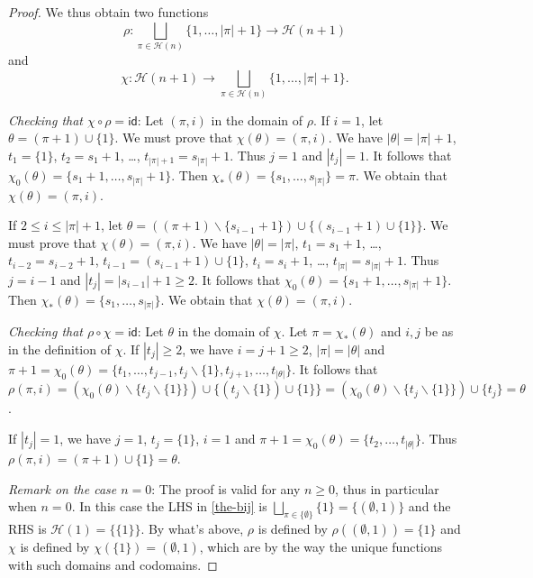 \documentclass[10pt,a4paper]{amsart}
\begin{document}
\begin{proof}
We thus obtain two functions 
\begin{equation*}
\rho\colon \underset{\pi \in \mathcal{H}(n)}{\bigsqcup}\{1,\dots,|\pi|+1\} \longrightarrow \mathcal{H}(n+1)
\end{equation*}
and
\begin{equation*}
\chi\colon \mathcal{H}(n+1) \longrightarrow \underset{\pi \in \mathcal{H}(n)}{\bigsqcup}\{1,\dots,|\pi|+1\}.
\end{equation*}

\emph{Checking that $\chi \circ \rho=\mathsf{id}$}: Let $(\pi,i)$ in the domain of $\rho$. If $i=1$, let $\theta=(\pi+1) \cup \{1\}$. We must prove that 
$\chi(\theta)=(\pi,i)$. We have $|\theta|=|\pi|+1$, $t_1=\{1\}$, $t_2=s_1+1$, \dots, $t_{|\pi|+1}=s_{|\pi|}+1$. Thus $j=1$ and $|t_j|=1$. It follows that 
$\chi_0(\theta)=\{s_1+1,\dots,s_{|\pi|}+1\}$. Then $\chi_*(\theta)=\{s_1,\dots,s_{|\pi|}\}=\pi$. We obtain that $\chi(\theta)=(\pi,i)$.

If $2 \le i \le |\pi|+1$, let $\theta=((\pi+1) \backslash \{s_{i-1}+1\}) \cup \{(s_{i-1}+1) \cup \{1\}\}$. We must prove that $\chi(\theta)=(\pi,i)$. We have 
$|\theta|=|\pi|$, $t_1=s_1+1$, \dots, $t_{i-2}=s_{i-2}+1$, $t_{i-1}=(s_{i-1}+1) \cup \{1\}$, $t_i=s_i+1$, \dots, $t_{|\pi|}=s_{|\pi|}+1$. Thus $j=i-1$ and 
$|t_j|=|s_{i-1}|+1 \ge 2$. It follows that $\chi_0(\theta)=\{s_1+1,\dots,s_{|\pi|}+1\}$. Then $\chi_*(\theta)=\{s_1,\dots,s_{|\pi|}\}$. We obtain that $\chi(\theta)=(\pi,i)$.

\emph{Checking that $\rho \circ \chi=\mathsf{id}$}: Let $\theta$ in the domain of $\chi$. Let $\pi=\chi_*(\theta)$ and $i,j$ be as in the definition of 
$\chi$. If $|t_j| \ge 2$, we have $i=j+1 \ge 2$, $|\pi|=|\theta|$ and $\pi+1=\chi_0(\theta)=\{t_1,\dots,t_{j-1},t_j \backslash \{1\},t_{j+1},\dots,t_{|\theta|}\}$. 
It follows that $\rho(\pi,i)=(\chi_0(\theta) \backslash \{t_j \backslash \{1\}\}) \cup \{(t_j \backslash \{1\}) \cup \{1\}\}=(\chi_0(\theta) 
\backslash \{t_j \backslash \{1\}\}) \cup \{t_j\}=\theta$.

If $|t_j|=1$, we have $j=1$, $t_j=\{1\}$, $i=1$ and $\pi+1=\chi_0(\theta)=\{t_2,\dots,t_{|\theta|}\}$. Thus $\rho(\pi,i)=(\pi+1) \cup \{1\}=\theta$.

\emph{Remark on the case $n=0$}: The proof is valid for any $n \ge 0$, thus in particular when $n=0$. In this case the LHS in \cref{the-bij} is 
$\underset{\pi \in \{\emptyset\}}{\bigsqcup}\{1\}=\{(\emptyset,1)\}$ and the RHS is $\mathcal{H}(1)=\{\{1\}\}$. By what's above, $\rho$ is defined by 
$\rho((\emptyset,1))=\{1\}$ and $\chi$ is defined by $\chi(\{1\})=(\emptyset,1)$, which are by the way the unique functions with such domains and codomains.
\end{proof}
\end{document}
